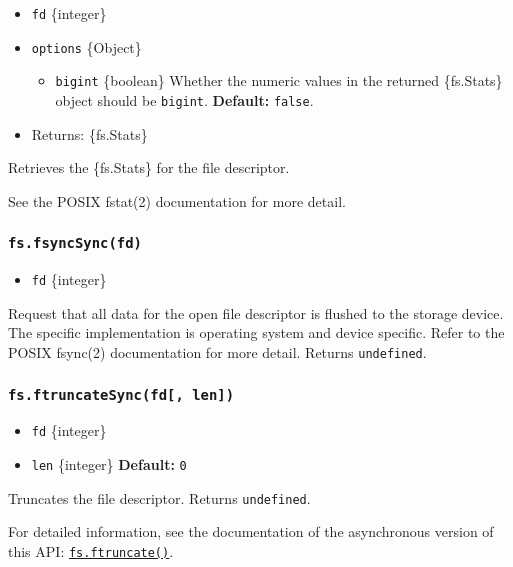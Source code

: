 \begin{itemize}
\tightlist
\item
  \texttt{fd} \{integer\}
\item
  \texttt{options} \{Object\}

  \begin{itemize}
  \tightlist
  \item
    \texttt{bigint} \{boolean\} Whether the numeric values in the
    returned \{fs.Stats\} object should be \texttt{bigint}.
    \textbf{Default:} \texttt{false}.
  \end{itemize}
\item
  Returns: \{fs.Stats\}
\end{itemize}

Retrieves the \{fs.Stats\} for the file descriptor.

See the POSIX fstat(2) documentation for more detail.

\subsubsection{\texorpdfstring{\texttt{fs.fsyncSync(fd)}}{fs.fsyncSync(fd)}}\label{fs.fsyncsyncfd}

\begin{itemize}
\tightlist
\item
  \texttt{fd} \{integer\}
\end{itemize}

Request that all data for the open file descriptor is flushed to the
storage device. The specific implementation is operating system and
device specific. Refer to the POSIX fsync(2) documentation for more
detail. Returns \texttt{undefined}.

\subsubsection{\texorpdfstring{\texttt{fs.ftruncateSync(fd{[},\ len{]})}}{fs.ftruncateSync(fd{[}, len{]})}}\label{fs.ftruncatesyncfd-len}

\begin{itemize}
\tightlist
\item
  \texttt{fd} \{integer\}
\item
  \texttt{len} \{integer\} \textbf{Default:} \texttt{0}
\end{itemize}

Truncates the file descriptor. Returns \texttt{undefined}.

For detailed information, see the documentation of the asynchronous
version of this API:
\hyperref[fsftruncatefd-len-callback]{\texttt{fs.ftruncate()}}.


